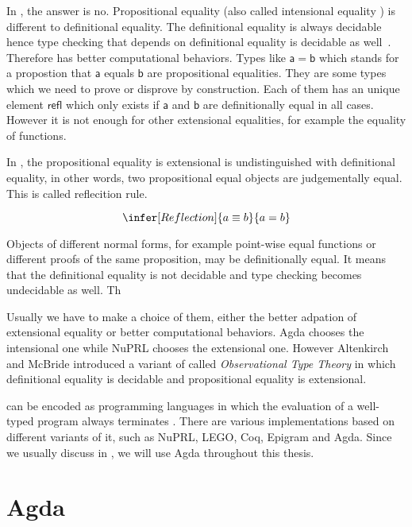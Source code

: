 In \itt, the answer is no. Propositional equality (also called intensional equality  \cite{nor:90}) is different to definitional equality. 
The definitional equality is always decidable hence type checking that depends on definitional equality is
decidable as well~\cite{alti:lics99}. Therefore \itt has better computational behaviors.
Types like $\mathsf{a = b}$ which stands for a
propostion that $\mathsf{a}$ equals $\mathsf{b}$ are propositional equalities. They are some types which we need to prove
or disprove by construction. Each of them has an unique element $\mathsf{refl}$ which only exists if $\mathsf{a}$ and $\mathsf{b}$ are
definitionally equal in all cases. However it is not enough for other extensional equalities, for example the equality of functions.





In \ett, the propositional equality is extensional is undistinguished with definitional equality, in other words, two propositional equal objects are judgementally equal. This is called reflecition rule.

\begin{equation*}
\infer[Reflection]{a \equiv b}{a = b}
\end{equation*}

Objects of different normal forms, for example point-wise equal functions or different proofs of the same proposition, may be definitionally equal. It means that the definitional equality is not decidable and type checking becomes undecidable as well. Th


Usually we have to make a choice of them, either the better adpation of extensional equality or better computational behaviors. Agda chooses the intensional one while NuPRL chooses the extensional one. However
Altenkirch and McBride introduced a variant of \ett called
\emph{Observational Type Theory}  \cite{alt:06} in which definitional equality is
decidable and propositional equality is extensional.


\mltt can be encoded as programming languages in
which the evaluation of a well-typed program always terminates \cite{nor:90}.
There are various implementations based on different variants of it, such as
NuPRL, LEGO, Coq, Epigram and Agda. Since we usually discuss in \itt, we will use Agda throughout this thesis.

\section{Agda}



